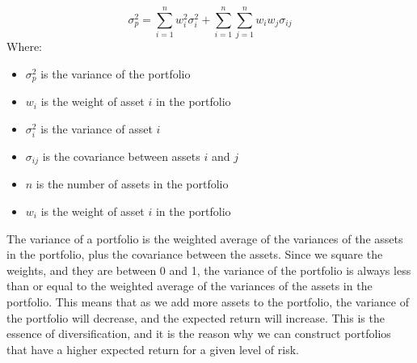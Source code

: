 \begin{equation}
    \label{eq:portfolio_risk}
    \sigma_p^2 = \sum_{i=1}^n w_i^2 \sigma_i^2 + \sum_{i=1}^n \sum_{j=1}^n w_i w_j \sigma_{ij}
\end{equation}
Where:
\begin{itemize}
    \item $\sigma_p^2$ is the variance of the portfolio
    \item $w_i$ is the weight of asset $i$ in the portfolio
    \item $\sigma_i^2$ is the variance of asset $i$
    \item $\sigma_{ij}$ is the covariance between assets $i$ and $j$
    \item $n$ is the number of assets in the portfolio
    \item $w_i$ is the weight of asset $i$ in the portfolio
 \end{itemize}
The variance of a portfolio is the weighted average of the variances of the assets in the portfolio, plus the covariance between the assets.
Since we square the weights, and they are between 0 and 1, the variance of the portfolio is always less than or equal to the weighted average of the variances of the assets in the portfolio.
This means that as we add more assets to the portfolio, the variance of the portfolio will decrease, and the expected return will increase.
This is the essence of diversification, and it is the reason why we can construct portfolios that have a higher expected return for a given level of risk.

